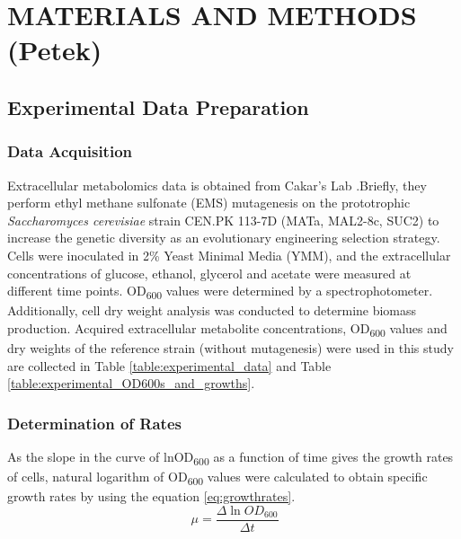 \chapter{MATERIALS AND METHODS (Petek)}

\section{Experimental Data Preparation}
\subsection{Data Acquisition}
Extracellular metabolomics data is obtained from Cakar's Lab \cite{arslan2018physiological}.Briefly, they perform ethyl methane sulfonate (EMS) mutagenesis  on the prototrophic \emph{Saccharomyces cerevisiae} strain CEN.PK 113-7D (MATa, MAL2-8c, SUC2) to increase the genetic diversity as an evolutionary engineering selection strategy. Cells were inoculated in 2\% Yeast Minimal Media (YMM), and the extracellular concentrations of glucose, ethanol, glycerol and acetate were measured at different time points. OD\textsubscript{600} values were determined by a spectrophotometer. Additionally, cell dry weight analysis was conducted to determine biomass production. Acquired extracellular metabolite concentrations, OD\textsubscript{600} values and dry weights of the reference strain (without mutagenesis) were used in this study are collected in Table \ref{table:experimental_data} and Table \ref{table:experimental_OD600s_and_growths}.




\subsection{Determination of Rates}
As the slope in the curve of lnOD\textsubscript{600} as a function of time gives the growth rates of cells, natural logarithm of OD\textsubscript{600} values were calculated to obtain specific growth rates by using the equation \ref{eq:growthrates}.
  \begin{equation}
      \ \mu = \frac{\Delta \ln{OD_{600}}}{\Delta t}
      \label{eq:growthrates}
  \end{equation}

